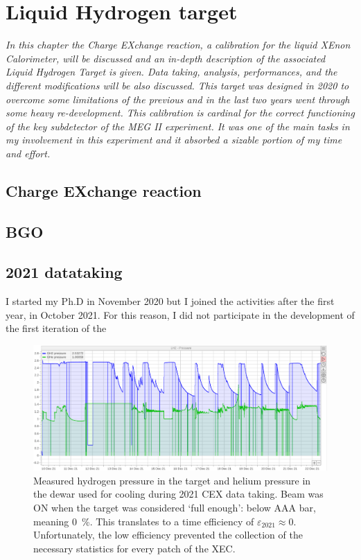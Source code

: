 \chapter{Liquid Hydrogen target}
\begin{refsection}
{\itshape In this chapter the Charge EXchange reaction, a calibration for the liquid XEnon Calorimeter, will be discussed and an in-depth description of the associated Liquid Hydrogen Target is given. 
Data taking, analysis, performances, and the different modifications will be also discussed.
This target was designed in 2020 to overcome some limitations of the previous and in the last two years went through some heavy re-development.
This calibration is cardinal for the correct functioning of the key subdetector of the MEG II experiment. It  was one of the main tasks in my involvement in this experiment and it absorbed a sizable portion of my time and effort.}
\section{Charge EXchange reaction}
\section{BGO}

\section{2021 datataking}
I started my Ph.D in November 2020 but I joined the activities after the first year, in October 2021. For this reason, I did not participate in the development of the first iteration of the  
\begin{figure}
    \centering
    \includegraphics[width = \textwidth]{Figures/LH2/2021CEX_LH2.png}
    \caption{Measured hydrogen pressure in the target and helium pressure in the dewar used for cooling during 2021 CEX data taking. 
    Beam was ON when the target was considered `full enough': below AAA bar, meaning \SI{0}{\%}. 
    This translates to a time efficiency of $\varepsilon_{2021}\approx0$. 
    Unfortunately, the low efficiency prevented the collection of the necessary statistics for every patch of the XEC.}
    \label{fig:CEX2021}
\end{figure}

\end{refsection}
